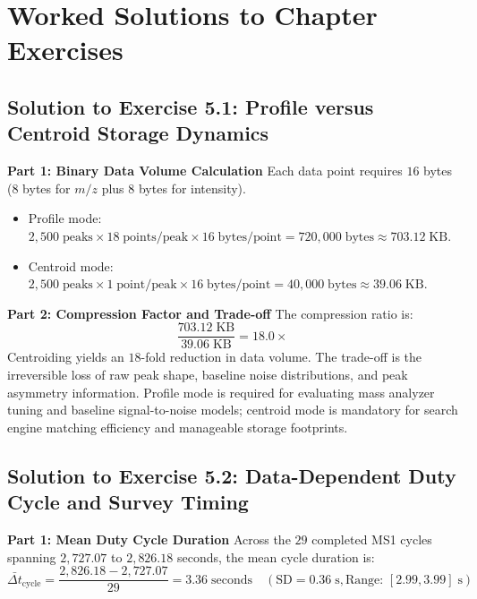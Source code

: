 \documentclass[11pt,twoside,openright]{book}
\begin{document}
\FloatBarrier

\section{Worked Solutions to Chapter Exercises}
\label{sec:solutions}

\subsection{Solution to Exercise 5.1: Profile versus Centroid Storage Dynamics}
\noindent\textbf{Part 1: Binary Data Volume Calculation}\enspace
Each data point requires $16$ bytes ($8$ bytes for $m/z$ plus $8$ bytes for intensity).
\begin{itemize}
    \item Profile mode: $2,500\;\text{peaks} \times 18\;\text{points/peak} \times 16\;\text{bytes/point} = 720,000\;\text{bytes} \approx 703.12\;\text{KB}$.
    \item Centroid mode: $2,500\;\text{peaks} \times 1\;\text{point/peak} \times 16\;\text{bytes/point} = 40,000\;\text{bytes} \approx 39.06\;\text{KB}$.
\end{itemize}

\noindent\textbf{Part 2: Compression Factor and Trade-off}\enspace
The compression ratio is:
\begin{equation}
\frac{703.12\;\text{KB}}{39.06\;\text{KB}} = 18.0\times
\end{equation}
Centroiding yields an $18$-fold reduction in data volume. The trade-off is the irreversible loss of raw peak shape, baseline noise distributions, and peak asymmetry information. Profile mode is required for evaluating mass analyzer tuning and baseline signal-to-noise models; centroid mode is mandatory for search engine matching efficiency and manageable storage footprints.

\subsection{Solution to Exercise 5.2: Data-Dependent Duty Cycle and Survey Timing}
\noindent\textbf{Part 1: Mean Duty Cycle Duration}\enspace
Across the $29$ completed MS1 cycles spanning $2,727.07$ to $2,826.18$ seconds, the mean cycle duration is:
\begin{equation}
\bar{\Delta t}_{\text{cycle}} = \frac{2,826.18 - 2,727.07}{29} = 3.36\;\text{seconds} \quad (\text{SD} = 0.36\;\text{s}, \text{Range: } [2.99, 3.99]\;\text{s})
\end{equation}
\end{document}
